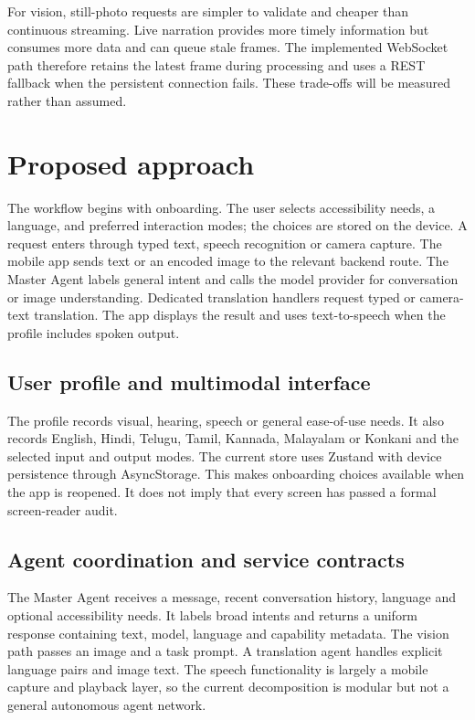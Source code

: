 \documentclass[12pt,a4paper,oneside]{report}
\begin{document}
For vision, still-photo requests are simpler to validate and cheaper than continuous streaming. Live narration provides more timely information but consumes more data and can queue stale frames. The implemented WebSocket path therefore retains the latest frame during processing and uses a REST fallback when the persistent connection fails. These trade-offs will be measured rather than assumed.

\section{Proposed approach}
The workflow begins with onboarding. The user selects accessibility needs, a language, and preferred interaction modes; the choices are stored on the device. A request enters through typed text, speech recognition or camera capture. The mobile app sends text or an encoded image to the relevant backend route. The Master Agent labels general intent and calls the model provider for conversation or image understanding. Dedicated translation handlers request typed or camera-text translation. The app displays the result and uses text-to-speech when the profile includes spoken output.

\subsection{User profile and multimodal interface}
The profile records visual, hearing, speech or general ease-of-use needs. It also records English, Hindi, Telugu, Tamil, Kannada, Malayalam or Konkani and the selected input and output modes. The current store uses Zustand with device persistence through AsyncStorage. This makes onboarding choices available when the app is reopened. It does not imply that every screen has passed a formal screen-reader audit.

\subsection{Agent coordination and service contracts}
The Master Agent receives a message, recent conversation history, language and optional accessibility needs. It labels broad intents and returns a uniform response containing text, model, language and capability metadata. The vision path passes an image and a task prompt. A translation agent handles explicit language pairs and image text. The speech functionality is largely a mobile capture and playback layer, so the current decomposition is modular but not a general autonomous agent network.
\end{document}
